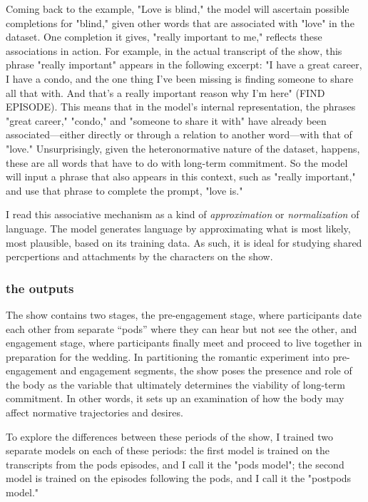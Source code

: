 \documentclass[11pt]{article}
\begin{document}
Coming back to the example, "Love is blind," the model will ascertain
possible completions for "blind," given other words that are
associated with "love" in the dataset. One completion it gives,
"really important to me," reflects these associations in action. For
example, in the actual transcript of the show, this phrase "really
important" appears in the following excerpt: "I have a great career, I
have a condo, and the one thing I've been missing is finding someone
to share all that with. And that's a really important reason why I'm
here" (FIND EPISODE). This means that in the model's internal
representation, the phrases "great career," "condo," and "someone to
share it with" have already been associated---either directly or
through a relation to another word---with that of "love."
Unsurprisingly, given the heteronormative nature of the dataset,
happens, these are all words that have to do with long-term
commitment. So the model will input a phrase that also appears in this
context, such as "really important," and use that phrase to complete
the prompt, "love is."

I read this associative mechanism as a kind of \emph{approximation} or
\emph{normalization} of language. The model generates language by
approximating what is most likely, most plausible, based on its
training data. As such, it is ideal for studying shared percpertions
and attachments by the characters on the show.

\subsubsection{the outputs}
\label{sec:orge969e9a}
The show contains two stages, the pre-engagement stage, where
participants date each other from separate “pods” where they can hear
but not see the other, and engagement stage, where participants
finally meet and proceed to live together in preparation for the
wedding. In partitioning the romantic experiment into pre-engagement
and engagement segments, the show poses the presence and role of the
body as the variable that ultimately determines the viability of
long-term commitment. In other words, it sets up an examination of how
the body may affect normative trajectories and desires.

To explore the differences between these periods of the show, I
trained two separate models on each of these periods: the first model
is trained on the transcripts from the pods episodes, and I call it
the "pods model"; the second model is trained on the episodes
following the pods, and I call it the "postpods model."
\end{document}

